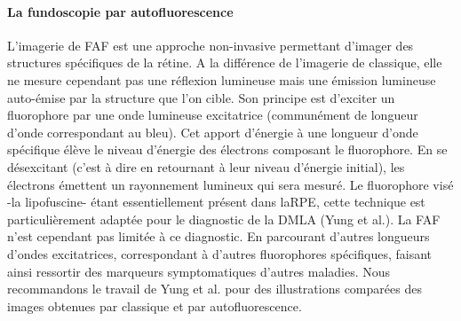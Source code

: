 \paragraph{La fundoscopie par autofluorescence}
L'imagerie de \ac{FAF} est une approche non-invasive permettant d'imager des structures spécifiques de la rétine. A la différence de l'imagerie de \fundus{} classique, elle ne mesure cependant pas une réflexion lumineuse mais une émission lumineuse auto-émise par la structure que l'on cible.
Son principe est d'exciter un fluorophore par une onde lumineuse excitatrice (communément de longueur d'onde correspondant au bleu). Cet apport d'énergie à une longueur d'onde spécifique élève le niveau d'énergie des électrons composant le fluorophore. En se désexcitant (c'est à dire en retournant à leur niveau d'énergie initial), les électrons émettent un rayonnement lumineux qui sera mesuré. Le fluorophore visé -la lipofuscine- étant essentiellement présent dans la\ac{RPE}, cette technique est particulièrement adaptée pour le diagnostic de la \ac{DMLA} 
(Yung et al.\cite{yungClinicalApplicationsFundus2016}). La \ac{FAF} n'est cependant pas limitée à ce diagnostic. En parcourant d'autres longueurs d'ondes excitatrices, correspondant à d'autres fluorophores spécifiques, faisant ainsi ressortir des marqueurs symptomatiques d'autres maladies. Nous recommandons le travail de Yung et al. \cite{yungClinicalApplicationsFundus2016} pour des illustrations comparées des images obtenues par \fundus{} classique et par autofluorescence.


